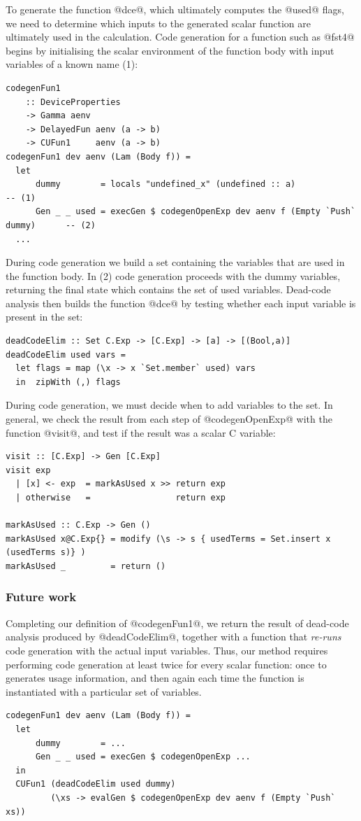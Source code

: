 To generate the function @dce@, which ultimately computes the @used@ flags, we
need to determine which inputs to the generated scalar function are ultimately
used in the calculation. Code generation for a function such as @fst4@ begins by
initialising the scalar environment of the function body with input variables of
a known name (1):
%
\begin{lstlisting}[style=haskell]
codegenFun1
    :: DeviceProperties
    -> Gamma aenv
    -> DelayedFun aenv (a -> b)
    -> CUFun1     aenv (a -> b)
codegenFun1 dev aenv (Lam (Body f)) =
  let
      dummy        = locals "undefined_x" (undefined :: a)                         -- (1)
      Gen _ _ used = execGen $ codegenOpenExp dev aenv f (Empty `Push` dummy)      -- (2)
  ...
\end{lstlisting}
%
During code generation we build a set containing the variables that are used in
the function body. In (2) code generation proceeds with the dummy variables,
returning the final state which contains the set of used variables. Dead-code
analysis then builds the function @dce@ by testing whether each input variable
is present in the set:
%
\begin{lstlisting}[style=haskell]
deadCodeElim :: Set C.Exp -> [C.Exp] -> [a] -> [(Bool,a)]
deadCodeElim used vars =
  let flags = map (\x -> x `Set.member` used) vars
  in  zipWith (,) flags
\end{lstlisting}

During code generation, we must decide when to add variables to the set. In
general, we check the result from each step of @codegenOpenExp@ with the
function @visit@, and test if the result was a scalar C variable:
%
\begin{lstlisting}[style=haskell]
visit :: [C.Exp] -> Gen [C.Exp]
visit exp
  | [x] <- exp  = markAsUsed x >> return exp
  | otherwise   =                 return exp

markAsUsed :: C.Exp -> Gen ()
markAsUsed x@C.Exp{} = modify (\s -> s { usedTerms = Set.insert x (usedTerms s)} )
markAsUsed _         = return ()
\end{lstlisting}


\subsubsection{Future work}

Completing our definition of @codegenFun1@, we return the result of
dead-code analysis produced by @deadCodeElim@, together with a function
that \emph{re-runs} code generation with the actual input variables. Thus, our
method requires performing code generation at least twice for every scalar
function: once to generates usage information, and then again each time the
function is instantiated with a particular set of variables.
%
\begin{lstlisting}[style=haskell,firstnumber=7]
codegenFun1 dev aenv (Lam (Body f)) =
  let
      dummy        = ...
      Gen _ _ used = execGen $ codegenOpenExp ...
  in
  CUFun1 (deadCodeElim used dummy)
         (\xs -> evalGen $ codegenOpenExp dev aenv f (Empty `Push` xs))
\end{lstlisting}

